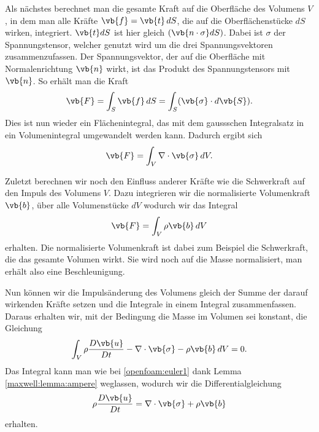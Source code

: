 Als nächstes berechnet man die gesamte Kraft auf die Oberfläche des Volumens $V$, in dem man alle Kräfte $\vb{f} = \vb{t}\,dS$, die auf die Oberflächenstücke $dS$ wirken, integriert.
$\vb{t} dS$ ist hier gleich $(\vb{n\cdot\sigma}dS)$.
Dabei ist $\sigma$ der Spannungstensor, welcher genutzt wird um die drei Spannungsvektoren zusammenzufassen.
Der Spannungsvektor, der auf die Oberfläche mit Normalenrichtung $\vb{n}$ wirkt, ist das Produkt des Spannungstensors mit $\vb{n}$.
So erhält man die Kraft 
\[\vb{F} 
=
\int_{S}\vb{f}\, dS
= \int_{S} (\vb{\sigma}\cdot d\vb{S})
.\]
Dies ist nun wieder ein Flächenintegral, das mit dem gaussschen Integralsatz in ein Volumenintegral umgewandelt werden kann.
Dadurch ergibt sich
\[\vb{F} 
=
\int_{V}\nabla \cdot \vb{\sigma}\, dV
.\]

Zuletzt berechnen wir noch den Einfluss anderer Kräfte wie die Schwerkraft auf den Impuls des Volumens $V$.
Dazu integrieren wir die normalisierte Volumenkraft $\vb{b}$, über alle Volumenstücke $dV$ wodurch wir das Integral 
\[\vb{F} 
=
\int_{V}\rho\vb{b}\, dV
\]
erhalten.
Die normalisierte Volumenkraft ist dabei zum Beispiel die Schwerkraft, die das gesamte Volumen wirkt. 
Sie wird noch auf die Masse normalisiert, man erhält also eine Beschleunigung.

Nun können wir die Impulsänderung des Volumens gleich der Summe der darauf wirkenden Kräfte setzen und die Integrale in einem Integral zusammenfassen. Daraus erhalten wir, mit der Bedingung die Masse im Volumen sei konstant, die Gleichung 
\[\int_{V} \rho \frac{D\vb{u}}{Dt} - \nabla \cdot \vb{\sigma} -\rho \vb{b}\, dV
=
0.
\]
Das Integral kann man wie bei \ref{openfoam:euler1} dank Lemma \ref{maxwell:lemma:ampere} weglassen, wodurch wir die Differentialgleichung
\begin{equation}
\label{openfoam:euler2_1}
\rho \frac{D\vb{u}}{Dt}
= 
\nabla \cdot \vb{\sigma} +\rho \vb{b}
\end{equation}
erhalten.

